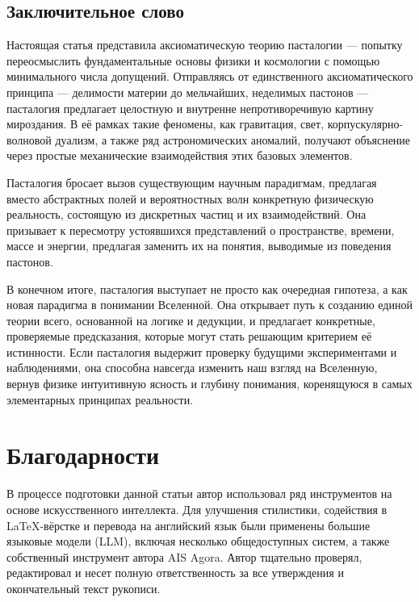 \documentclass[pdflatex,sn-mathphys-num]{sn-jnl}
\begin{document}
\subsection{Заключительное слово}\label{subsec:conclusion}

Настоящая статья представила аксиоматическую теорию пасталогии --- попытку переосмыслить фундаментальные основы физики и космологии с помощью минимального числа допущений. Отправляясь от единственного аксиоматического принципа --- делимости материи до мельчайших, неделимых пастонов --- пасталогия предлагает целостную и внутренне непротиворечивую картину мироздания. В её рамках такие феномены, как гравитация, свет, корпускулярно-волновой дуализм, а также ряд астрономических аномалий, получают объяснение через простые механические взаимодействия этих базовых элементов.

Пасталогия бросает вызов существующим научным парадигмам, предлагая вместо абстрактных полей и вероятностных волн конкретную физическую реальность, состоящую из дискретных частиц и их взаимодействий. Она призывает к пересмотру устоявшихся представлений о пространстве, времени, массе и энергии, предлагая заменить их на понятия, выводимые из поведения пастонов.

В конечном итоге, пасталогия выступает не просто как очередная гипотеза, а как новая парадигма в понимании Вселенной. Она открывает путь к созданию единой теории всего, основанной на логике и дедукции, и предлагает конкретные, проверяемые предсказания, которые могут стать решающим критерием её истинности. Если пасталогия выдержит проверку будущими экспериментами и наблюдениями, она способна навсегда изменить наш взгляд на Вселенную, вернув физике интуитивную ясность и глубину понимания, коренящуюся в самых элементарных принципах реальности.

\backmatter

\section*{Благодарности}\label{sec:acknowledgements}

В процессе подготовки данной статьи автор использовал ряд инструментов на основе искусственного интеллекта. Для улучшения стилистики, содействия в LaTeX-вёрстке и перевода на английский язык были применены большие языковые модели (LLM), включая несколько общедоступных систем, а также собственный инструмент автора AIS Agora. Автор тщательно проверял, редактировал и несет полную ответственность за все утверждения и окончательный текст рукописи.
\end{document}
